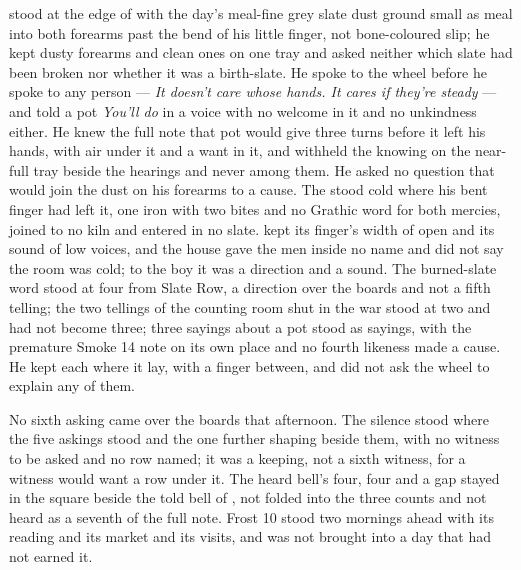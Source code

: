  stood at the edge of  with the day's meal-fine grey slate dust ground small as meal into both forearms past the bend of his little finger, not bone-coloured slip; he kept dusty forearms and clean ones on one tray and asked neither which slate had been broken nor whether it was a birth-slate. He spoke to the wheel before he spoke to any person --- \emph{It doesn't care whose hands. It cares if they're steady} --- and told a pot \emph{You'll do} in a voice with no welcome in it and no unkindness either. He knew the full note that pot would give three turns before it left his hands, with air under it and a want in it, and withheld the knowing on the near-full tray beside the hearings and never among them. He asked no question that would join the dust on his forearms to a cause. The  stood cold where his bent finger had left it, one iron with two bites and no Grathic word for both mercies, joined to no kiln and entered in no slate.  kept its finger's width of open and its sound of low voices, and the house gave the men inside no name and did not say the room was cold; to the boy it was a direction and a sound. The burned-slate word stood at four from Slate Row, a direction over the boards and not a fifth telling; the two tellings of the counting room shut in the war stood at two and had not become three; three sayings about a pot stood as sayings, with the premature Smoke 14 note on its own place and no fourth likeness made a cause. He kept each where it lay, with a finger between, and did not ask the wheel to explain any of them.

No sixth asking came over the boards that afternoon. The silence stood where the five askings stood and the one further shaping beside them, with no witness to be asked and no row named; it was a keeping, not a sixth witness, for a witness would want a row under it. The heard bell's four, four and a gap stayed in the square beside the told bell of , not folded into the three counts and not heard as a seventh of the full note. Frost 10 stood two mornings ahead with its reading and its market and its visits, and was not brought into a day that had not earned it.

